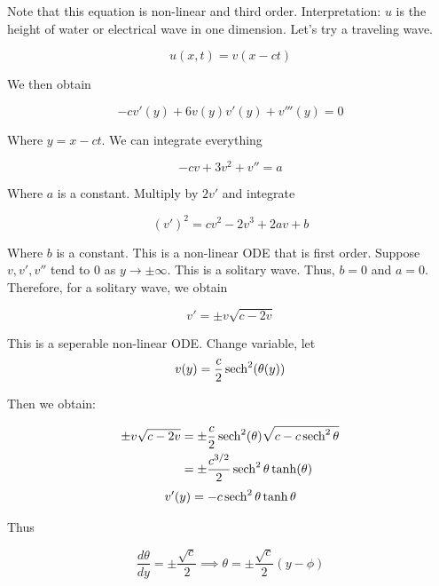 \documentclass{article}
\newtheorem{one minute paper}[theorem]{One Minute Paper}
\begin{document}
Note that this equation is non-linear and third order. Interpretation: $u$ is the height of water or electrical wave in one dimension.
Let's try a traveling wave. 

\begin{equation}
    u(x,t) = v(x - ct)
\end{equation}

We then obtain 

\begin{equation}
    -cv'(y) + 6v(y)v'(y) + v'''(y) = 0
\end{equation}

Where $y = x - ct$. We can integrate everything 

\begin{equation}
    -c v + 3v^2 + v'' = a
\end{equation}

Where $a$ is a constant. Multiply by $2v'$ and integrate 

\begin{equation}
    (v')^2 = cv^2 - 2v^3 + 2av + b
\end{equation}

Where $b$ is a constant. This is a non-linear ODE that is first order. Suppose $v,v',v''$ tend to $0$ as $y \rightarrow \pm \infty$. This is a solitary wave. 
Thus, $b=0$ and $a=0$. Therefore, for a solitary wave, we obtain 

\begin{equation}
    v' = \pm v\sqrt{c - 2v}
\end{equation}

This is a seperable non-linear ODE. Change variable, let $$v(y) = \frac{c}{2}\sech^2(\theta(y))$$ 

Then we obtain:

\begin{align}
    \pm v\sqrt{c - 2v} &= \pm \frac{c}{2}\sech^2(\theta)\sqrt{c - c\sech^2\theta} \\
    &= \pm\frac{c^{3/2}}{2}\sech^2\theta \tanh(\theta)  
\end{align}
\begin{equation}
    v'(y) = -c\sech^2\theta \tanh\theta
\end{equation}

Thus 

\begin{equation}
    \frac{d\theta}{dy} = \pm \frac{\sqrt{c}}{2} \implies \theta = \pm \frac{\sqrt{c}}{2}\left( y - \phi \right)
\end{equation}
\end{document}
